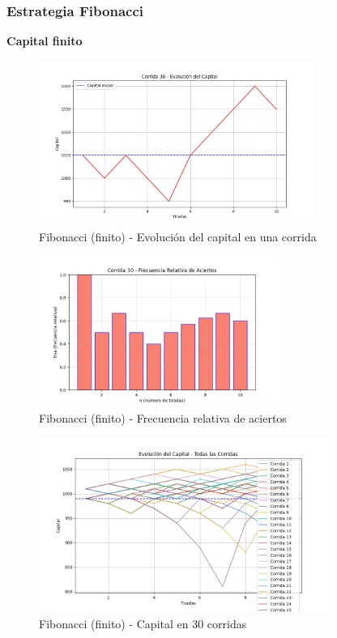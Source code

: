 \documentclass{article}
\begin{document}
\vspace{0.5cm}

\subsubsection*{Estrategia Fibonacci}

\textbf{Capital finito}

\begin{figure}
    \centering
    \includegraphics[width=0.8\textwidth]{./images/capital_corrida_30_f_f.png}
    \caption{Fibonacci (finito) - Evolución del capital en una corrida}
\end{figure}

\begin{figure}
    \centering
    \includegraphics[width=0.7\textwidth]{./images/frsa_corrida_30_f_f.png}
    \caption{Fibonacci (finito) - Frecuencia relativa de aciertos}
\end{figure}

\begin{figure}
    \centering
    \includegraphics[width=0.85\textwidth]{./images/capital_todas_corridas_f_f.png}
    \caption{Fibonacci (finito) - Capital en 30 corridas}
\end{figure}
\end{document}
